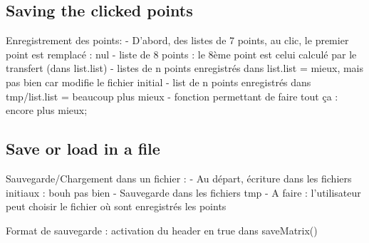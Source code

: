 \documentclass{report}
\begin{document}
\subsection{Saving the clicked points}
Enregistrement des points:
    - D’abord, des listes de 7 points, au clic, le premier point est remplacé : nul
    - liste de 8 points : le 8ème point est celui calculé par le transfert (dans list.list)
    - listes de n points enregistrés dans list.list = mieux, mais pas bien car modifie le fichier initial
    - list de n points enregistrés dans tmp/list.list = beaucoup plus mieux
    - fonction permettant de faire tout ça : encore plus mieux;
\subsection{Save or load in a file}
Sauvegarde/Chargement dans un fichier :
    - Au départ, écriture dans les fichiers initiaux : bouh pas bien
    - Sauvegarde dans les fichiers tmp
    - A faire : l’utilisateur peut choisir le fichier où sont enregistrés les points

Format de sauvegarde : activation du header en true dans saveMatrix()
\end{document}
